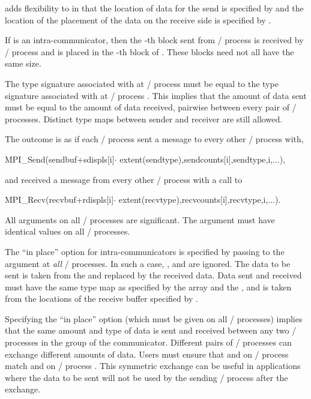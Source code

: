  adds flexibility to  in that
the location of data for the send is specified by 
and the location of the placement of the data on the receive side
is specified by .

If  is an intra-communicator, then
the
-th
block sent from \MPI/ process  is received by \MPI/ process 
and is placed in the
-th
block of .  These blocks need not all have the same size.

The type signature associated with
 at \MPI/ process  must be equal
to the type signature
associated with  at \MPI/ process .
This implies that the amount of data sent must be equal to the
amount of data received, pairwise between every pair of \MPI/ processes.
Distinct type maps between sender and receiver are still allowed.

The outcome is as if each \MPI/ process sent a message to every other \MPI/ process
with,
\begin{mpicodeblock}
MPI\_Send(sendbuf+sdispls[i]$\cdot$ extent(sendtype),sendcounts[i],sendtype,i,...),
\end{mpicodeblock}
\noindent and received a message from every other \MPI/ process with
a call to
\begin{mpicodeblock}
MPI\_Recv(recvbuf+rdispls[i]$\cdot$ extent(recvtype),recvcounts[i],recvtype,i,...).
\end{mpicodeblock}

All arguments
on all \MPI/ processes are significant.  The argument 
must have identical values on all \MPI/ processes.

The ``in place'' option for intra-communicators is specified by passing
 to the argument  at \emph{all} \MPI/ processes.
In such a case, ,  and  are ignored.
The data to be sent is taken from the  and replaced by the received data.
Data sent and received must have the same type map as specified by the 
array and the , and is taken from the locations of the receive buffer
specified by .

\begin{users}
Specifying the ``in place'' option (which must be given on all \MPI/ processes)
implies that the same amount and type of data is sent and received between
any two \MPI/ processes in the group of the communicator.
Different pairs of \MPI/ processes can exchange different amounts of data.
Users must ensure that  and  on \MPI/ process
 match  and  on \MPI/ process .
This symmetric exchange can be useful in applications where the data to be sent will
not be used by the sending \MPI/ process after the  exchange.
\end{users}


